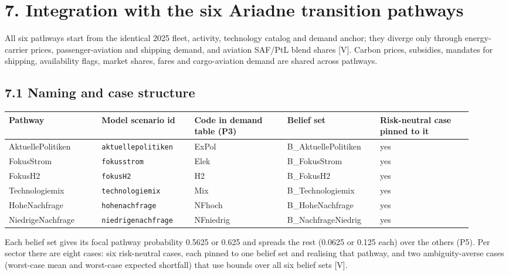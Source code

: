 \documentclass[11pt,a4paper]{article}
\begin{document}
\section*{7. Integration with the six Ariadne transition pathways}

All six pathways start from the identical 2025 fleet, activity, technology catalog and demand anchor; they diverge only through energy-carrier prices, passenger-aviation and shipping demand, and aviation SAF/PtL blend shares [V]. Carbon prices, subsidies, mandates for shipping, availability flags, market shares, fares and cargo-aviation demand are shared across pathways.

\subsection*{7.1 Naming and case structure}

{\footnotesize\setlength{\tabcolsep}{3pt}
\begin{longtable}{>{\raggedright\arraybackslash}p{0.184\linewidth}>{\raggedright\arraybackslash}p{0.184\linewidth}>{\raggedright\arraybackslash}p{0.184\linewidth}>{\raggedright\arraybackslash}p{0.184\linewidth}>{\raggedright\arraybackslash}p{0.184\linewidth}}
\toprule
\textbf{Pathway} & \textbf{Model scenario id} & \textbf{Code in demand table (P3)} & \textbf{Belief set} & \textbf{Risk-neutral case pinned to it} \tabularnewline
\midrule
\endhead
AktuellePolitiken & \texttt{aktuellepolitiken} & ExPol & B\_AktuellePolitiken & yes \tabularnewline
FokusStrom & \texttt{fokusstrom} & Elek & B\_FokusStrom & yes \tabularnewline
FokusH2 & \texttt{fokusH2} & H2 & B\_FokusH2 & yes \tabularnewline
Technologiemix & \texttt{technologiemix} & Mix & B\_Technologiemix & yes \tabularnewline
HoheNachfrage & \texttt{hohenachfrage} & NFhoch & B\_HoheNachfrage & yes \tabularnewline
NiedrigeNachfrage & \texttt{niedrigenachfrage} & NFniedrig & B\_NachfrageNiedrig & yes \tabularnewline
\bottomrule
\end{longtable}}

Each belief set gives its focal pathway probability 0.5625 or 0.625 and spreads the rest (0.0625 or 0.125 each) over the others (P5). Per sector there are eight cases: six risk-neutral cases, each pinned to one belief set and realising that pathway, and two ambiguity-averse cases (worst-case mean and worst-case expected shortfall) that use bounds over all six belief sets [V].
\end{document}
